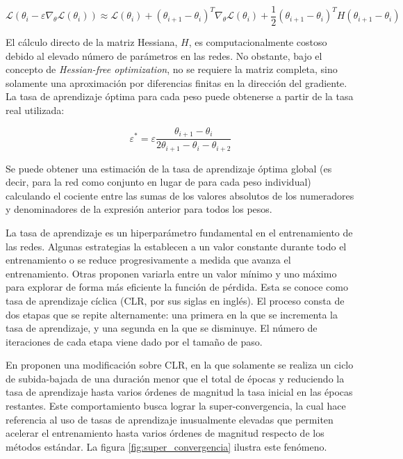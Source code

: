 \documentclass{article}
\begin{document}
	\begin{equation}
		\mathcal{L}(\theta_{i} - \varepsilon \nabla_{\theta} \mathcal{L}(\theta_{i})) \approx \mathcal{L}(\theta_{i}) + (\theta_{i+1} - \theta_{i})^{T} \nabla_{\theta} \mathcal{L}(\theta_{i}) + \frac{1}{2}(\theta_{i+1} - \theta_{i})^{T} H(\theta_{i+1} - \theta_{i})
	\end{equation}
	
	El cálculo directo de la matriz Hessiana, $H$, es computacionalmente costoso debido al elevado número de parámetros en las redes. No obstante, bajo el concepto de \textit{Hessian-free optimization}, no se requiere la matriz completa, sino solamente una aproximación por diferencias finitas en la dirección del gradiente. La tasa de aprendizaje óptima para cada peso puede obtenerse a partir de la tasa real utilizada:
	\newpage
	
	\begin{equation}
		\varepsilon^* = \varepsilon \frac{\theta_{i+1} - \theta_i}{2\theta_{i+1} - \theta_i - \theta_{i+2}}
	\end{equation}
	
	Se puede obtener una estimación de la tasa de aprendizaje óptima global (es decir, para la red como conjunto en lugar de para cada peso individual) calculando el cociente entre las sumas de los valores absolutos de los numeradores y denominadores de la expresión anterior para todos los pesos.
	
	La tasa de aprendizaje es un hiperparámetro fundamental en el entrenamiento de las redes. Algunas estrategias la establecen a un valor constante durante todo el entrenamiento o se reduce progresivamente a medida que avanza el entrenamiento. Otras proponen variarla entre un valor mínimo y uno máximo para explorar de forma más eficiente la función de pérdida. Esta se conoce como tasa de aprendizaje cíclica (CLR, por sus siglas en inglés). El proceso consta de dos etapas que se repite alternamente: una primera en la que se incrementa la tasa de aprendizaje, y una segunda en la que se disminuye. El número de iteraciones de cada etapa viene dado por el tamaño de paso. 
	
	En \cite{smith2017super} proponen una modificación sobre CLR, en la que solamente se realiza un ciclo de subida-bajada de una duración menor que el total de épocas y reduciendo la tasa de aprendizaje hasta varios órdenes de magnitud la tasa inicial en las épocas restantes. Este comportamiento busca lograr la super-convergencia, la cual hace referencia al uso de tasas de aprendizaje inusualmente elevadas que permiten acelerar el entrenamiento hasta varios órdenes de magnitud respecto de los métodos estándar. La figura \ref{fig:super_convergencia} ilustra este fenómeno.
	
\end{document}
